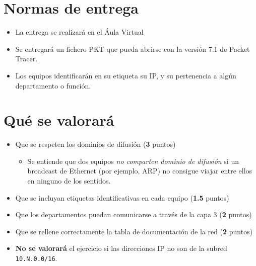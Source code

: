 \section{Normas de entrega}
\begin{itemize}
  
\item La entrega se realizará en el Áula Virtual
\item Se entregará un fichero PKT que pueda abrirse con la versión 7.1 de Packet Tracer.
\item Los equipos identificarán en su etiqueta su IP, y su pertenencia a algún departamento o función.
\end{itemize}

\section{Qué se valorará}
\begin{itemize}
\item Que se respeten los dominios de difusión (\textbf{3} puntos)
  \begin{itemize}
  \item Se entiende que dos equipos \textit{no comparten dominio de difusión} si un broadcast de Ethernet (por ejemplo, ARP) no consigue viajar entre ellos en ninguno de los sentidos.
  \end{itemize}
\item Que se incluyan etiquetas identificativas en cada equipo (\textbf{1.5} puntos)  
\item Que los departamentos puedan comunicarse a través de la capa 3 (\textbf{2} puntos)
\item Que se rellene correctamente la tabla de documentación de la red (\textbf{2} puntos)
\item \textbf{No se valorará} el ejercicio si las direcciones IP no son de la subred \texttt{10.N.0.0/16}.
\end{itemize}




